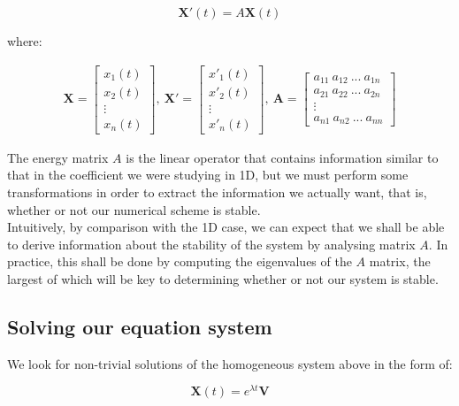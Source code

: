 \begin{equation}
	\mathbf{X}'(t)=A \mathbf{X}(t)
\end{equation}

where:

\begin{align}
\mathbf{X}  = \begin{bmatrix}
		x_{1}(t) \\
		x_{2}(t) \\
		\vdots \\
		x_{n}(t)
	\end{bmatrix}  , ~
\mathbf{X'}  =	\begin{bmatrix}
		x'_{1}(t) \\
		x'_{2}(t) \\
		\vdots \\
		x'_{n}(t)
	\end{bmatrix}  ,  ~
	\mathbf{A}  =\begin{bmatrix}
		a_{11}   ~a_{12} ~ ...  ~a_{1n}\\           
		a_{21}   ~a_{22} ~ ...  ~a_{2n}\\           
		\vdots \\
		a_{n1}  ~ a_{n2}  ~... ~ a_{nn}
	\end{bmatrix} 
\end{align}

The energy matrix $A$ is the linear operator that contains information similar to that in the coefficient we were studying in 1D, but we must perform some transformations in order to extract the information we actually want, that is, whether or not our numerical scheme is stable. \\

Intuitively, by comparison with the 1D case, we can expect that we shall be able to derive information about the stability of the system by analysing matrix $A$. In practice, this shall be done by computing the eigenvalues of the $A$ matrix, the largest of which will be key to determining whether or not our system is stable.

\subsection{Solving our equation system}
We look for non-trivial solutions of the homogeneous system above in the form of:

\begin{equation}
	\mathbf{X}(t)=e^{\lambda t} \mathbf{V}
\end{equation}

